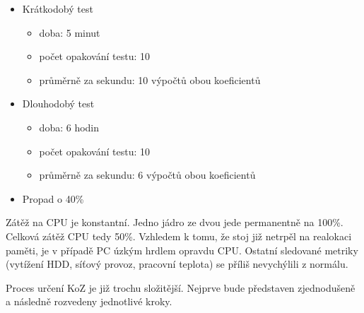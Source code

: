 \begin{itemize}
	\setlength{\parskip}{0pt}
	\setlength{\itemsep}{0pt}
	\item {Krátkodobý test}
	\begin{itemize}
		\setlength{\parskip}{0pt}
		\setlength{\itemsep}{0pt}
		\item {doba: 5 minut}
		\item {počet opakování testu: 10}
		\item {průměrně za sekundu: 10 výpočtů obou koeficientů}
	\end{itemize}
	\item {Dlouhodobý test}
	\begin{itemize}
		\setlength{\parskip}{0pt}
		\setlength{\itemsep}{0pt}
		\item {doba: 6 hodin}
		\item {počet opakování testu: 10}
		\item {průměrně za sekundu: 6 výpočtů obou koeficientů}
	\end{itemize}
	\item {Propad o 40\%}
\end{itemize}

Zátěž na CPU je konstantní. Jedno jádro ze dvou jede permanentně na 100\%. Celková zátěž CPU tedy 50\%. Vzhledem k tomu, že stoj již netrpěl na realokaci paměti, je v případě PC úzkým hrdlem opravdu CPU. Ostatní sledované metriky (vytížení HDD, síťový provoz, pracovní teplota) se příliš nevychýlili z normálu.



Proces určení KoZ je již trochu složitější. Nejprve bude představen zjednodušeně a následně rozvedeny jednotlivé kroky.

